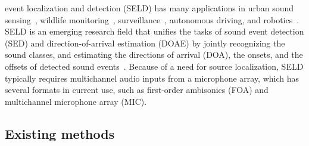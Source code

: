 \documentclass[journal]{IEEEtran}
\begin{document}
 event localization and detection (SELD) has many applications in urban sound sensing~\cite{Salamon2017DeepClassification}, wildlife monitoring~\cite{Stowell2016BirdChallenge}, surveillance~\cite{Foggia2016AudioSounds}, autonomous driving, 
and robotics~\cite{Valin2004LocalizationApproach}. SELD is an emerging research field that unifies the tasks of sound event detection (SED) and direction-of-arrival estimation (DOAE) by jointly recognizing the sound classes, and estimating the directions of arrival (DOA), the onsets, and the offsets of detected sound events~\cite{Adavanne2019SoundNetworks}. Because of a need for source localization, SELD typically requires multichannel audio inputs from a microphone array, which has several formats in current use, such as first-order ambisonics (FOA) and multichannel microphone array (MIC).  

\subsection{Existing methods}
\end{document}
